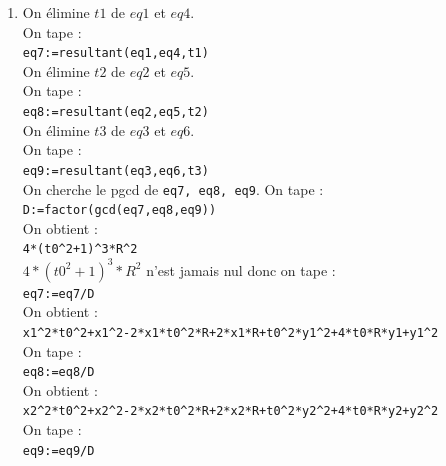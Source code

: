 \documentclass[a4paper,11pt]{book}
\begin{document}
\begin{enumerate}
{\tt eq2:=x2*t2\verb|^|2*t0\verb|^|2+x2*t2\verb|^|2+x2*t0\verb|^|2+x2+2*R*t2\verb|^|2-2*R*t0\verb|^|2}\\
{\tt eq3:=x3*t3\verb|^|2*t0\verb|^|2+x3*t3\verb|^|2+x3*t0\verb|^|2+x3+2*R*t3\verb|^|2-2*R*t0\verb|^|2}\\
{\tt eq4:=y1*t1\verb|^|2*t0\verb|^|2+y1*t1\verb|^|2+y1*t0\verb|^|2+y1+2*R*t1\verb|^|2*t0-\\2*R*t1*t0\verb|^|2-2*R*t1+2*R*t0}\\
{\tt eq5:=y2*t2\verb|^|2*t0\verb|^|2+y2*t2\verb|^|2+y2*t0\verb|^|2+y2+2*R*t2\verb|^|2*t0-\\2*R*t2*t0\verb|^|2-2*R*t2+2*R*t0}\\
{\tt eq6:=y3*t3\verb|^|2*t0\verb|^|2+y3*t3\verb|^|2+y3*t0\verb|^|2+y3+2*R*t3\verb|^|2*t0-\\2*R*t3*t0\verb|^|2-2*R*t3+2*R*t0}
\item On \'elimine $t1$ de $eq1$ et $eq4$.\\
On tape :\\
{\tt eq7:=resultant(eq1,eq4,t1)}\\
On \'elimine $t2$ de $eq2$ et $eq5$.\\
On tape :\\
{\tt eq8:=resultant(eq2,eq5,t2)}\\
On \'elimine $t3$ de $eq3$ et $eq6$.\\
On tape :\\
{\tt eq9:=resultant(eq3,eq6,t3)}\\
On cherche le pgcd de {\tt eq7, eq8, eq9}. On tape :\\
{\tt D:=factor(gcd(eq7,eq8,eq9))}\\
On obtient :\\
{\tt 4*(t0\verb|^|2+1)\verb|^|3*R\verb|^|2}\\
$4*(t0^2+1)^3*R^2$ n'est jamais nul donc on tape :\\
{\tt eq7:=eq7/D}\\
On obtient :\\
{\tt x1\verb|^|2*t0\verb|^|2+x1\verb|^|2-2*x1*t0\verb|^|2*R+2*x1*R+t0\verb|^|2*y1\verb|^|2+4*t0*R*y1+y1\verb|^|2}\\
On tape :\\
{\tt eq8:=eq8/D}\\
On obtient :\\
{\tt x2\verb|^|2*t0\verb|^|2+x2\verb|^|2-2*x2*t0\verb|^|2*R+2*x2*R+t0\verb|^|2*y2\verb|^|2+4*t0*R*y2+y2\verb|^|2}\\
On tape :\\
{\tt eq9:=eq9/D}\\

\end{enumerate}
\end{document}
